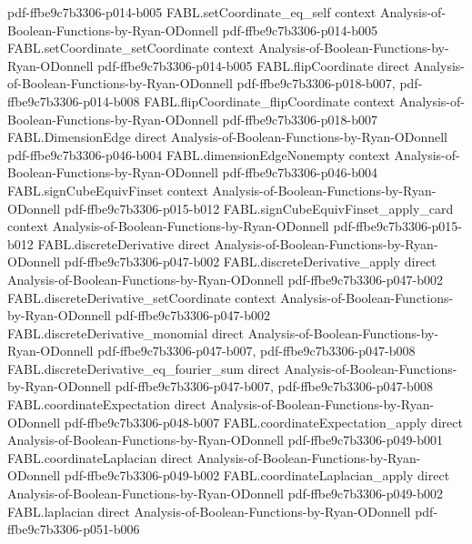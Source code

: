 \begin{theorem}
  {pdf-ffbe9c7b3306-p014-b005}
\proofstep
  {FABL.setCoordinate_eq_self}
  {context}
  {Analysis-of-Boolean-Functions-by-Ryan-ODonnell}
  {pdf-ffbe9c7b3306-p014-b005}
\proofstep
  {FABL.setCoordinate_setCoordinate}
  {context}
  {Analysis-of-Boolean-Functions-by-Ryan-ODonnell}
  {pdf-ffbe9c7b3306-p014-b005}
\proofstep
  {FABL.flipCoordinate}
  {direct}
  {Analysis-of-Boolean-Functions-by-Ryan-ODonnell}
  {pdf-ffbe9c7b3306-p018-b007,
    pdf-ffbe9c7b3306-p014-b008}
\proofstep
  {FABL.flipCoordinate_flipCoordinate}
  {context}
  {Analysis-of-Boolean-Functions-by-Ryan-ODonnell}
  {pdf-ffbe9c7b3306-p018-b007}
\proofstep
  {FABL.DimensionEdge}
  {direct}
  {Analysis-of-Boolean-Functions-by-Ryan-ODonnell}
  {pdf-ffbe9c7b3306-p046-b004}
\proofstep
  {FABL.dimensionEdgeNonempty}
  {context}
  {Analysis-of-Boolean-Functions-by-Ryan-ODonnell}
  {pdf-ffbe9c7b3306-p046-b004}
\proofstep
  {FABL.signCubeEquivFinset}
  {context}
  {Analysis-of-Boolean-Functions-by-Ryan-ODonnell}
  {pdf-ffbe9c7b3306-p015-b012}
\proofstep
  {FABL.signCubeEquivFinset_apply_card}
  {context}
  {Analysis-of-Boolean-Functions-by-Ryan-ODonnell}
  {pdf-ffbe9c7b3306-p015-b012}
\proofstep
  {FABL.discreteDerivative}
  {direct}
  {Analysis-of-Boolean-Functions-by-Ryan-ODonnell}
  {pdf-ffbe9c7b3306-p047-b002}
\proofstep
  {FABL.discreteDerivative_apply}
  {direct}
  {Analysis-of-Boolean-Functions-by-Ryan-ODonnell}
  {pdf-ffbe9c7b3306-p047-b002}
\proofstep
  {FABL.discreteDerivative_setCoordinate}
  {context}
  {Analysis-of-Boolean-Functions-by-Ryan-ODonnell}
  {pdf-ffbe9c7b3306-p047-b002}
\proofstep
  {FABL.discreteDerivative_monomial}
  {direct}
  {Analysis-of-Boolean-Functions-by-Ryan-ODonnell}
  {pdf-ffbe9c7b3306-p047-b007,
    pdf-ffbe9c7b3306-p047-b008}
\proofstep
  {FABL.discreteDerivative_eq_fourier_sum}
  {direct}
  {Analysis-of-Boolean-Functions-by-Ryan-ODonnell}
  {pdf-ffbe9c7b3306-p047-b007,
    pdf-ffbe9c7b3306-p047-b008}
\proofstep
  {FABL.coordinateExpectation}
  {direct}
  {Analysis-of-Boolean-Functions-by-Ryan-ODonnell}
  {pdf-ffbe9c7b3306-p048-b007}
\proofstep
  {FABL.coordinateExpectation_apply}
  {direct}
  {Analysis-of-Boolean-Functions-by-Ryan-ODonnell}
  {pdf-ffbe9c7b3306-p049-b001}
\proofstep
  {FABL.coordinateLaplacian}
  {direct}
  {Analysis-of-Boolean-Functions-by-Ryan-ODonnell}
  {pdf-ffbe9c7b3306-p049-b002}
\proofstep
  {FABL.coordinateLaplacian_apply}
  {direct}
  {Analysis-of-Boolean-Functions-by-Ryan-ODonnell}
  {pdf-ffbe9c7b3306-p049-b002}
\proofstep
  {FABL.laplacian}
  {direct}
  {Analysis-of-Boolean-Functions-by-Ryan-ODonnell}
  {pdf-ffbe9c7b3306-p051-b006}
\proofstep

\end{theorem}
